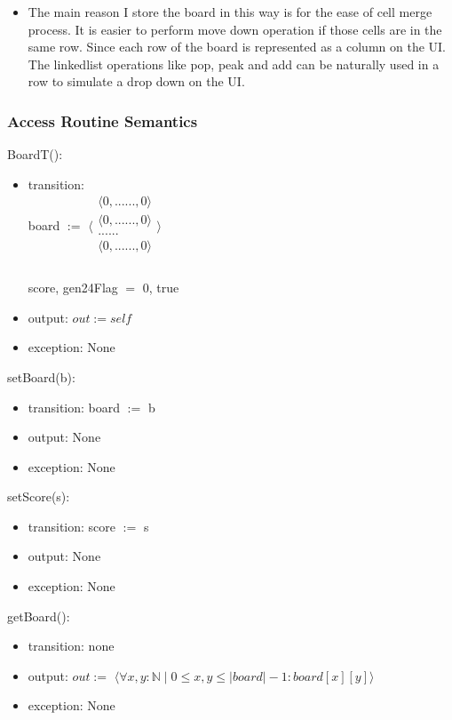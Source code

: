 \documentclass[12pt]{article}
\begin{document}
\begin{itemize}
  \item The main reason I store the board in this way is for the ease of cell merge process. It is easier to perform move down operation if those cells are in the same row. Since each row of the board is represented as a column on the UI. The linkedlist operations like pop, peak and add can be naturally used in a row to simulate a drop down on the UI.
\end{itemize}

\subsubsection* {Access Routine Semantics}

BoardT():
\begin{itemize}
\item transition: \\
      board $:=$ 
      $\langle \begin{array}{c}
      \langle 0, ... ... , 0 \rangle\\
      \langle 0, ... ... , 0 \rangle\\
      ... ...\\
	 \langle 0, ... ... , 0 \rangle\\
      \end{array} \rangle$ \\ \\
      score, gen24Flag $=$ 0, true
\item output: $out := \mathit{self}$
\item exception: None
\end{itemize}

\noindent setBoard(b):
\begin{itemize}
\item transition: board $:=$ b
\item output: None
\item exception: None
\end{itemize}

\noindent setScore(s):
\begin{itemize}
\item transition: score $:=$ s
\item output: None
\item exception: None
\end{itemize}

\noindent getBoard():
\begin{itemize}
\item transition: none
\item output: $out :=$ $\langle \forall x, y : \mathbb{N} \mid 0 \leq x,y \leq |board| - 1 : board[x][y] \rangle$
\item exception: None
\end{itemize}
\end{document}
